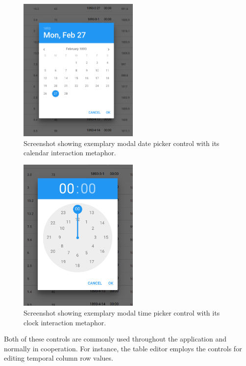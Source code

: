 \begin{figure}[h]
  \centering
  \includegraphics[width=0.525\textwidth]{figures/implementation/screenshot-date-picker}
  \caption{Screenshot showing exemplary modal date picker control with its calendar interaction metaphor.}
  \label{fig:screenshot-date-picker}
\end{figure}

\begin{figure}[h]
  \centering
  \includegraphics[width=0.525\textwidth]{figures/implementation/screenshot-time-picker}
  \caption{Screenshot showing exemplary modal time picker control with its clock interaction metaphor.}
  \label{fig:screenshot-time-picker}
\end{figure}

Both of these controls are commonly used throughout the application and normally in cooperation.
For instance, the table editor employs the controls for editing temporal column row values.

